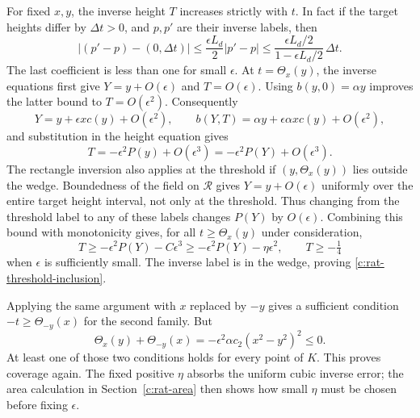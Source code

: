 For fixed $x,y$, the inverse height $T$ increases strictly with $t$.
In fact if the target heights differ by $\Delta t>0$, and $p,p'$
are their inverse labels, then
\[
 |(p'-p)-(0,\Delta t)|\le\frac{\epsilon L_d}{2}|p'-p|
 \le\frac{\epsilon L_d/2}{1-\epsilon L_d/2}\,\Delta t.
\]
The last coefficient is less than one for small $\epsilon$.
At $t=\Theta_x(y)$, the inverse equations first give
$Y=y+O(\epsilon)$ and $T=O(\epsilon)$.
Using $b(y,0)=\alpha y$ improves the latter bound to
$T=O(\epsilon^2)$.  Consequently
\[
 Y=y+\epsilon xc(y)+O(\epsilon^2),\qquad
 b(Y,T)=\alpha y+\epsilon\alpha xc(y)+O(\epsilon^2),
\]
and substitution in the height equation gives
\[
 T=-\epsilon^2P(y)+O(\epsilon^3)
   =-\epsilon^2P(Y)+O(\epsilon^3).
\]
The rectangle inversion also applies at the threshold if
$(y,\Theta_x(y))$ lies outside the wedge.  Boundedness of the field
on $\mathcal R$ gives $Y=y+O(\epsilon)$ uniformly over the entire
target height interval, not only at the threshold.  Thus changing from
the threshold label to any of these labels changes $P(Y)$ by
$O(\epsilon)$.  Combining this bound with monotonicity gives, for all
$t\ge\Theta_x(y)$ under consideration,
\[
 T\ge-\epsilon^2P(Y)-C\epsilon^3
       \ge-\epsilon^2P(Y)-\eta\epsilon^2,
 \qquad T\ge-\tfrac14
\]
when $\epsilon$ is sufficiently small.
The inverse label is in the wedge, proving
\eqref{c:rat-threshold-inclusion}.

Applying the same argument with $x$ replaced by $-y$ gives a sufficient
condition $-t\ge\Theta_{-y}(x)$ for the second family.  But
\[
 \Theta_x(y)+\Theta_{-y}(x)
   =-\epsilon^2\alpha c_2(x^2-y^2)^2\le0.
\]
At least one of those two conditions holds for every point of $K$.
This proves coverage again.  The fixed positive $\eta$ absorbs the
uniform cubic inverse error; the area calculation in
Section~\ref{c:rat-area} then shows how small $\eta$ must be chosen
before fixing $\epsilon$.
